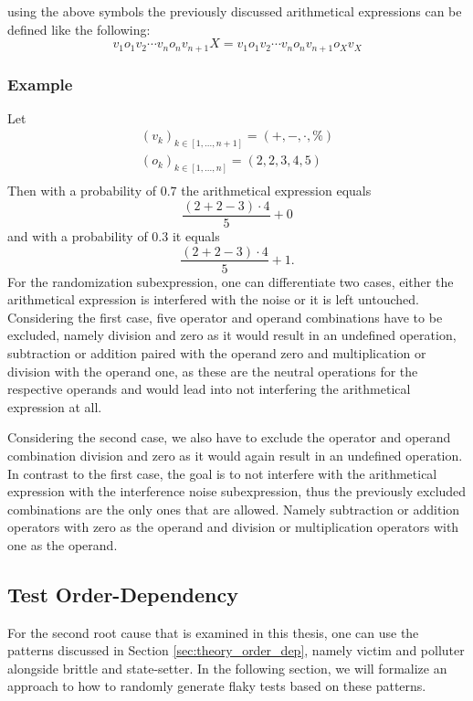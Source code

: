 \documentclass[
fancyheadings, %
%
%
]{stsreprt}
\begin{document}
using the above symbols the previously discussed arithmetical expressions can be defined like the following:
\[
    v_1 o_1 v_2 \cdots  v_n o_n v_{n+1} X = v_1 o_1 v_2 \cdots  v_n o_n v_{n+1} o_X v_X
\]
\subsubsection{Example}
Let 
\begin{gather*}
    (v_{k})_{k \in [1, ..., n+1]} = (+,-,\cdot, \%) \\
    (o_k)_{k \in [1, ..., n]} = (2,2,3,4,5) \\
\end{gather*}
Then with a probability of $0.7$ the arithmetical expression equals
\[
    \dfrac{(2 + 2 - 3) \cdot 4 }{5} + 0
\]
and with a probability of $0.3$ it equals 
\[
    \dfrac{(2 + 2 - 3) \cdot 4 }{5} + 1.
\]
For the randomization subexpression, one can differentiate two cases, either the arithmetical expression is interfered with the noise or it is left untouched.
Considering the first case, five operator and operand combinations have to be excluded, namely division and zero as it would result in an undefined operation, subtraction or addition paired with the operand zero and multiplication or division with the operand one, as these are the neutral operations for the respective operands and would lead into not interfering the arithmetical expression at all. \par 
Considering the second case, we also have to exclude the operator and operand combination division and zero as it would again result in an undefined operation. 
In contrast to the first case, the goal is to not interfere with the arithmetical expression with the interference noise subexpression, thus the previously excluded combinations are the only ones that are allowed. 
Namely subtraction or addition operators with zero as the operand and division or multiplication operators with one as the operand. 

\subsection{Test Order-Dependency}
For the second root cause that is examined in this thesis, one can use the patterns discussed in Section \ref{sec:theory_order_dep}, namely victim and polluter alongside brittle and state-setter.
In the following section, we will formalize an approach to how to randomly generate flaky tests based on these patterns. \par
\end{document}
